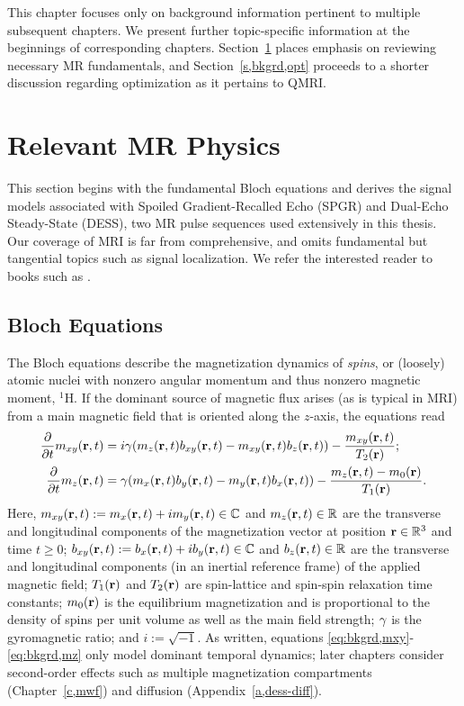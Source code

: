 
This chapter focuses
only on background information 
pertinent to multiple subsequent chapters.
We present further topic-specific information 
at the beginnings 
of corresponding chapters.
Section~\ref{s,bkgrd,mri} places emphasis
on reviewing necessary MR fundamentals,
and Section~\ref{s,bkgrd,opt}
proceeds to a shorter discussion
regarding optimization
as it pertains to QMRI.

\section{Relevant MR Physics}
\label{s,bkgrd,mri}

This section begins
with the fundamental Bloch equations
and derives the signal models
associated with 
Spoiled Gradient-Recalled Echo (SPGR) 
and Dual-Echo Steady-State (DESS),
two MR pulse sequences
used extensively in this thesis.
Our coverage of MRI
is far from comprehensive, 
and omits fundamental but tangential topics
such as signal localization.
We refer the interested reader
to books such as 
\cite{macovski:83,haacke:99,nishimura:96:pom}.

\subsection{Bloch Equations}
\label{ss,bkgrd,mri,bloch}

The Bloch equations
\cite{bloch:1946:ni-paper}
describe the magnetization dynamics
of \emph{spins}, 
or (loosely) atomic nuclei with nonzero 
angular momentum
and thus nonzero magnetic moment,
\eg $^1$H.
If the dominant source
of magnetic flux 
arises 
(as is typical in MRI)
from a main magnetic field
that is oriented along the $z$-axis,
the equations read
\begin{align}
	\dela{t} \mxy\prt &= i\gam\paren{\mz\prt \bxy\prt - \mxy\prt \bz\prt} -
		\frac{\mxy\prt}{\Tt\pr} ;
		\label{eq:bkgrd,mxy} \\
	\dela{t} \mz\prt &= \gam\paren{\mx\prt \by\prt - \my\prt \bx\prt} - 
		\frac{\mz\prt - \mzero\pr}{\To\pr}.
		\label{eq:bkgrd,mz}
\end{align}
Here, 
$\mxy\prt := \mx\prt + i\my\prt \in \complex$
and
$\mz\prt \in \real$
are the transverse and longitudinal components 
of the magnetization vector
at position $\mathbf{r} \in \mathbb{R}^{3}$ and time $t\geq0$;
$\bxy\prt := \bx\prt + i\by\prt \in \complex$
and 
$\bz\prt \in \real$
are the transverse and longitudinal components 
(in an inertial reference frame)
of the applied magnetic field;
$\To\pr$ and $\Tt\pr$
are spin-lattice and spin-spin relaxation time constants;
$\mzero\pr$ 
is the equilibrium magnetization
and is proportional to the density
of spins per unit volume
as well as the main field strength;
$\gamma$
is the gyromagnetic ratio;
and $i := \sqrt{-1}$.
As written,
equations \eqref{eq:bkgrd,mxy}-\eqref{eq:bkgrd,mz}
only model dominant temporal dynamics;
later chapters consider second-order effects
such as multiple magnetization compartments
(Chapter~\ref{c,mwf})
and diffusion
(Appendix~\ref{a,dess-diff}).

